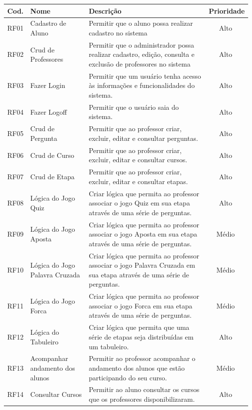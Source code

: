 \begin{center}
\begin{longtable}{c|p{4cm}|p{8cm}|c}
\hline
\textbf{Cod.} & \textbf{Nome} & \textbf{Descrição} & \textbf{Prioridade} \\
\hline RF01 & Cadastro de Aluno & Permitir que o aluno possa realizar cadastro no sistema & Alto ﻿\\
\hline RF02 & Crud de Professores & Permitir que o administrador possa realizar cadastro, edição, consulta e exclusão de professores no sistema & Alto ﻿\\
\hline RF03 & Fazer Login & Permitir que um usuário tenha acesso às informações e funcionalidades do sistema. & Alto ﻿\\
\hline RF04 & Fazer Logoff & Permitir que o usuário saia do sistema. & Alto ﻿\\
\hline RF05 & Crud de Pergunta & Permitir que ao professor criar, excluir, editar e consultar perguntas. & Alto ﻿\\
\hline RF06 & Crud de Curso & Permitir que ao professor criar, excluir, editar e consultar cursos. & Alto ﻿\\
\hline RF07 & Crud de Etapa & Permitir que ao professor criar, excluir, editar e consultar etapas. & Alto ﻿\\
\hline RF08 & Lógica do Jogo Quiz & Criar lógica que permita ao professor associar o jogo Quiz em sua etapa através de uma série de perguntas. & Alto ﻿\\
\hline RF09 & Lógica do Jogo Aposta & Criar lógica que permita ao professor associar o jogo Aposta em sua etapa através de uma série de perguntas. & Médio ﻿\\
\hline RF10 & Lógica do Jogo Palavra Cruzada & Criar lógica que permita ao professor associar o jogo Palavra Cruzada em sua etapa através de uma série de perguntas. & Médio ﻿\\
\hline RF11 & Lógica do Jogo Forca & Criar lógica que permita ao professor associar o jogo Forca em sua etapa através de uma série de perguntas. & Médio ﻿\\
\hline RF12 & Lógica do Tabuleiro & Criar lógica que permita que uma série de etapas seja distribuídas em um tabuleiro. & Alto ﻿\\
\hline RF13 & Acompanhar andamento dos alunos & Permitir ao professor acompanhar o andamento dos alunos que estão participando do seu curso. & Médio ﻿\\
\hline RF14 & Consultar Cursos & Permitir ao aluno consultar os cursos que os professores disponibilizaram. & Alto ﻿\\

\end{longtable}
\end{center}
